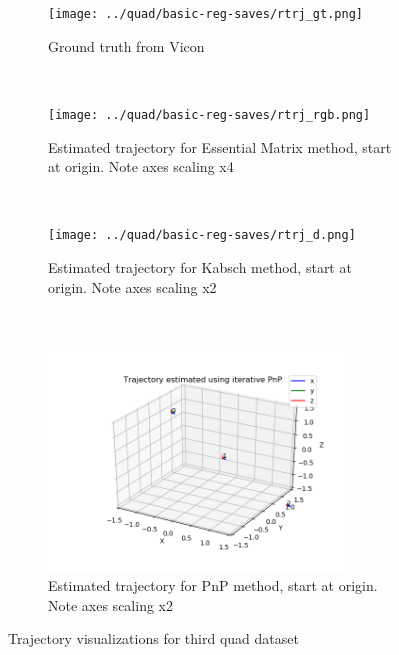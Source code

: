 \documentclass[12pt,a4paper]{article}
\begin{document}
\begin{figure}[p]
\begin{subfigure}[t]{0.5\textwidth}
  \centering
    \texttt{[image: ../quad/basic-reg-saves/rtrj\_gt.png]}
  \caption{Ground truth from Vicon}
  \end{subfigure}%
  ~
  \begin{subfigure}[t]{0.5\textwidth}
  \centering
    \texttt{[image: ../quad/basic-reg-saves/rtrj\_rgb.png]}
  \caption{Estimated trajectory for Essential Matrix method, start at origin. Note axes scaling x4}
  \end{subfigure}
  \\
  \begin{subfigure}[t]{0.5\textwidth}
  \centering
    \texttt{[image: ../quad/basic-reg-saves/rtrj\_d.png]}
  \caption{Estimated trajectory for Kabsch method, start at origin. Note axes scaling x2}
  \end{subfigure}%
  ~
  \begin{subfigure}[t]{0.5\textwidth}
  \centering
    \includegraphics[width=80mm]{../quad/basic-reg-saves/rtrj_pnp.png}
  \caption{Estimated trajectory for PnP method, start at origin. Note axes scaling x2}
  \end{subfigure}
  \caption{Trajectory visualizations for third quad dataset}
  \label{f: quad3 trj}
\end{figure}
\end{document}
